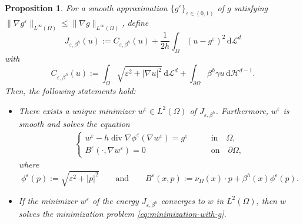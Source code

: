 \documentclass[11pt]{article}
\numberwithin{equation}{section}
\newtheorem{proposition}[theorem]{Proposition}
\newcommand{\pOmega}[0]{\partial\Omega}
\newcommand{\dL}[0]{\,\mathrm{d}\mathcal L^d}
\def\leq{\leqslant}
\begin{document}
\begin{proposition}\label{prop:gamma-convergence}
For a smooth approximation $\{g^{\varepsilon}\}_{\varepsilon\in(0,1)}$ of $g$ satisfying $\|\nabla g^{\varepsilon}\|_{L^{\infty}(\Omega)} \leq \|\nabla g\|_{L^{\infty}(\Omega)}$, define 
\[
J_{\varepsilon,\beta^h}(u) := C_{\varepsilon,\beta^h}(u) + \frac{1}{2h}\int_\Omega(u-g^\varepsilon)^2 \,\mathrm{d}\mathcal L^d
\]
with
\[
C_{\varepsilon,\beta^h}(u) := \int_\Omega\sqrt{\varepsilon^2 + |\nabla u|^2}\dL + \int_{\pOmega}\beta^h\gamma u\,\mathrm{d}\mathcal H^{d-1}.
\]
Then, the following statements hold:
\begin{itemize}
    \item[(i)] There exists a unique minimizer $w^{\varepsilon}\in L^2(\Omega)$ of $J_{\varepsilon,\beta^h}$. Furthermore, $w^{\varepsilon}$ is smooth and solves the equation
    \begin{align}\label{eq:E-L-approximate}
    \begin{cases}
    w^{\varepsilon} - h \operatorname{div} \nabla\phi^{\varepsilon}(\nabla w^{\varepsilon}) = g^{\varepsilon} &\qquad \text{in}\quad \Omega, \\
    B^{\varepsilon}(\cdot, \nabla w^{\varepsilon}) = 0 &\qquad \text{on}\quad \partial \Omega,
    \end{cases}
    \end{align}
    where
    \begin{equation*}
    \phi^{\varepsilon}(p) := \sqrt{\varepsilon^2+|p|^2}\qquad
    \mbox{and}\qquad
    B^{\varepsilon}(x, p) := \nu_{\Omega}(x) \cdot p + \beta^h(x) \phi^{\varepsilon}(p).
    \end{equation*}

    \item[(ii)] If the minimizer $w^\varepsilon$ of the energy $J_{\varepsilon,\beta^h}$ converges to $w$ in $L^2(\Omega)$, then $w$ solves the minimization problem \eqref{eq:minimization-with-g}.
\end{itemize}
\end{proposition}
\end{document}
